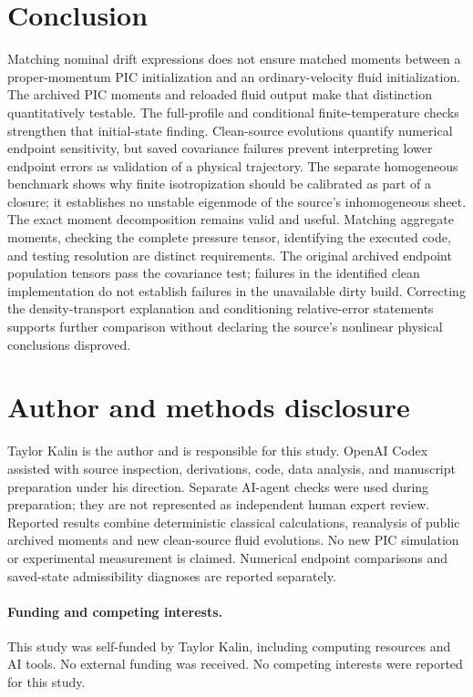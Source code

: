 \documentclass[11pt]{article}
\begin{document}
\section{Conclusion}
Matching nominal drift expressions does not ensure matched moments between
a proper-momentum PIC initialization and an ordinary-velocity fluid
initialization. The archived
PIC moments and reloaded fluid output make that distinction quantitatively
testable. The full-profile and conditional finite-temperature checks
strengthen that initial-state finding. Clean-source evolutions quantify
numerical endpoint sensitivity, but saved covariance failures prevent
interpreting lower endpoint errors as validation of a physical trajectory.
The separate homogeneous benchmark shows why finite isotropization should
be calibrated as part of a closure; it establishes no unstable eigenmode
of the source's inhomogeneous sheet.
The exact moment decomposition remains valid and useful. Matching aggregate
moments, checking the complete pressure tensor, identifying the executed code,
and testing resolution are distinct requirements. The original archived
endpoint population tensors pass the covariance test; failures in the identified clean implementation do
not establish failures in the unavailable dirty build. Correcting the
density-transport explanation and conditioning relative-error statements
supports further comparison without declaring the source's nonlinear
physical conclusions disproved.

\section*{Author and methods disclosure}
Taylor Kalin is the author and is responsible for this study. OpenAI Codex
assisted with source inspection, derivations, code, data analysis, and manuscript
preparation under his direction. Separate AI-agent checks were used during
preparation; they are not represented as independent human expert review.
Reported results combine deterministic classical calculations, reanalysis of
public archived moments and new clean-source fluid evolutions. No new PIC
simulation or experimental measurement is claimed. Numerical endpoint
comparisons and saved-state admissibility diagnoses are reported separately.

\paragraph{Funding and competing interests.}
This study was self-funded by Taylor Kalin, including computing resources and
AI tools. No external funding was received. No competing interests were
reported for this study.
\end{document}
